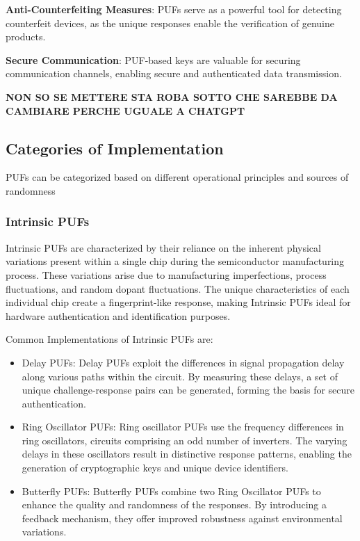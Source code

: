 \documentclass{article}
\begin{document}
\textbf{Anti-Counterfeiting Measures}: PUFs serve as a powerful tool for detecting counterfeit devices, as the unique responses enable the verification of genuine products.


\textbf{Secure Communication}: PUF-based keys are valuable for securing communication channels, enabling secure and authenticated data transmission.


\textbf{NON SO SE METTERE STA ROBA SOTTO CHE SAREBBE DA CAMBIARE PERCHE UGUALE A CHATGPT}

\subsection{Categories of Implementation}
PUFs can be categorized based on different operational principles and sources of randomness
\subsubsection{Intrinsic PUFs}

Intrinsic PUFs are characterized by their reliance on the inherent physical variations present within a single chip during the semiconductor manufacturing process. These variations arise due to manufacturing imperfections, process fluctuations, and random dopant fluctuations. The unique characteristics of each individual chip create a fingerprint-like response, making Intrinsic PUFs ideal for hardware authentication and identification purposes.

Common Implementations of Intrinsic PUFs are:
\begin{itemize}
\item Delay PUFs: Delay PUFs exploit the differences in signal propagation delay along various paths within the circuit. By measuring these delays, a set of unique challenge-response pairs can be generated, forming the basis for secure authentication.

\item Ring Oscillator PUFs: Ring oscillator PUFs use the frequency differences in ring oscillators, circuits comprising an odd number of inverters. The varying delays in these oscillators result in distinctive response patterns, enabling the generation of cryptographic keys and unique device identifiers.

\item Butterfly PUFs: Butterfly PUFs combine two Ring Oscillator PUFs to enhance the quality and randomness of the responses. By introducing a feedback mechanism, they offer improved robustness against environmental variations.

\end{itemize}
\end{document}
